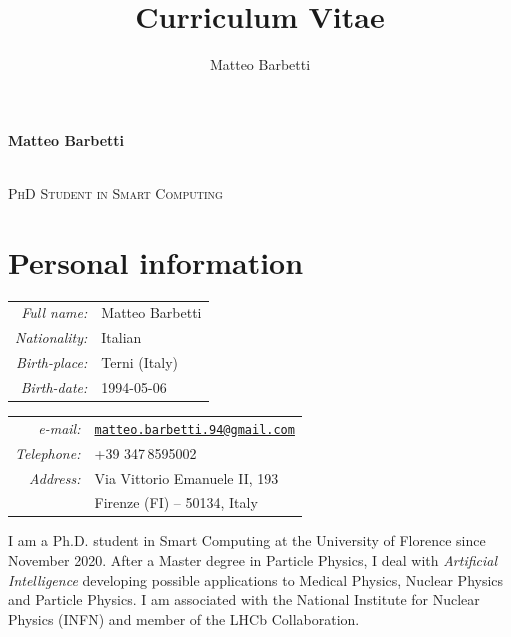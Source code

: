 \documentclass[a4, 11pt]{report}
\author{Matteo Barbetti}
\title{Curriculum Vitae}
\newcommand{\mail}[1]{\href{mailto:#1}{\texttt{#1}}}
\begin{document}
    \begin{center}
        \begin{Large}
            \textbf{Matteo Barbetti}
        \end{Large}\\[1mm]
        \textsc{PhD Student in Smart Computing}
    \end{center}
    
    \vskip 3mm
    
    \section*{Personal information}
        \begin{minipage}{0.45\textwidth}
            \begin{tabular}{rl}
                \textit{Full name:}   & Matteo Barbetti\\
                \textit{Nationality:} & {Italian}\\
                \textit{Birth-place:} & {Terni (Italy)}\\
                \textit{Birth-date:}  & {1994-05-06}\\          
            \end{tabular}
        \end{minipage}
        \hfill
        \begin{minipage}{0.5\textwidth}
            \begin{tabular}{rl}
                \textit{e-mail:}      & \mail{matteo.barbetti.94@gmail.com}\\
                \textit{Telephone:}   & +39\,\,347\,8595002\\
                \textit{Address:}     & Via Vittorio Emanuele II, 193\\
                                      & Firenze (FI) -- 50134, Italy\\
            \end{tabular}
        \end{minipage}

    \vskip 6mm

    \noindent
    I am a Ph.D. student in Smart Computing at the University of Florence since November 2020. After a Master degree in Particle Physics, I deal with \emph{Artificial Intelligence} developing possible applications to Medical Physics, Nuclear Physics and Particle Physics. I am associated with the National Institute for Nuclear Physics (INFN) and member of the LHCb Collaboration.
\end{document}
